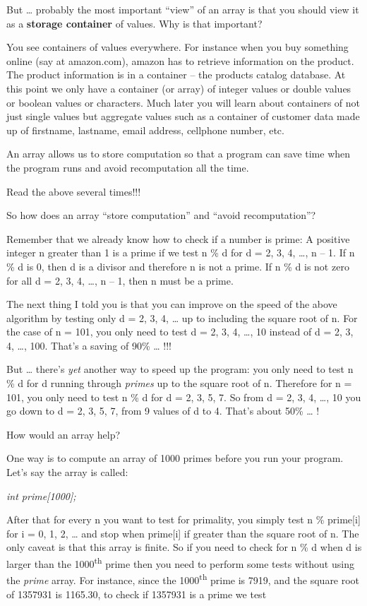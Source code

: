 \documentclass[
]{article}
\begin{document}
But \ldots{} probably the most important ``view'' of an array is that
you should view it as a \textbf{storage container} of values. Why is
that important?

You see containers of values everywhere. For instance when you buy
something online (say at amazon.com), amazon has to retrieve information
on the product. The product information is in a container -- the
products catalog database. At this point we only have a container (or
array) of integer values or double values or boolean values or
characters. Much later you will learn about containers of not just
single values but aggregate values such as a container of customer data
made up of firstname, lastname, email address, cellphone number, etc.

An array allows us to store computation so that a program can save time
when the program runs and avoid recomputation all the time.

Read the above several times!!!

So how does an array ``store computation'' and ``avoid recomputation''?

Remember that we already know how to check if a number is prime: A
positive integer n greater than 1 is a prime if we test n \% d for d =
2, 3, 4, \ldots, n -- 1. If n \% d is 0, then d is a divisor and
therefore n is not a prime. If n \% d is not zero for all d = 2, 3, 4,
\ldots, n -- 1, then n must be a prime.

The next thing I told you is that you can improve on the speed of the
above algorithm by testing only d = 2, 3, 4, \ldots{} up to including
the square root of n. For the case of n = 101, you only need to test d =
2, 3, 4, \ldots, 10 instead of d = 2, 3, 4, \ldots, 100. That's a saving
of 90\% \ldots{} !!!

But \ldots{} there's \emph{yet} another way to speed up the program: you
only need to test n \% d for d running through \emph{primes} up to the
square root of n. Therefore for n = 101, you only need to test n \% d
for d = 2, 3, 5, 7. So from d = 2, 3, 4, \ldots, 10 you go down to d =
2, 3, 5, 7, from 9 values of d to 4. That's about 50\% \ldots{} !

How would an array help?

One way is to compute an array of 1000 primes before you run your
program. Let's say the array is called:

\emph{int prime{[}1000{]};}

After that for every n you want to test for primality, you simply test n
\% prime{[}i{]} for i = 0, 1, 2, \ldots{} and stop when prime{[}i{]} if
greater than the square root of n. The only caveat is that this array is
finite. So if you need to check for n \% d when d is larger than the
1000\textsuperscript{th} prime then you need to perform some tests
without using the \emph{prime} array. For instance, since the
1000\textsuperscript{th} prime is 7919, and the square root of 1357931
is 1165.30, to check if 1357931 is a prime we test
\end{document}
